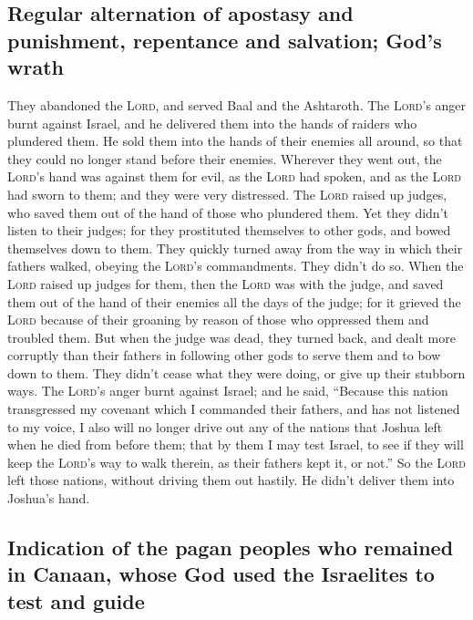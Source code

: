 \hypertarget{regular-alternation-of-apostasy-and-punishment-repentance-and-salvation-gods-wrath}{%
\subsection{Regular alternation of apostasy and punishment, repentance
and salvation; God's
wrath}\label{regular-alternation-of-apostasy-and-punishment-repentance-and-salvation-gods-wrath}}

 They abandoned the \textsc{Lord}, and served Baal and
the Ashtaroth.  The \textsc{Lord}'s anger burnt against
Israel, and he delivered them into the hands of raiders who plundered
them. He sold them into the hands of their enemies all around, so that
they could no longer stand before their enemies. 
Wherever they went out, the \textsc{Lord}'s hand was against them for
evil, as the \textsc{Lord} had spoken, and as the \textsc{Lord} had
sworn to them; and they were very distressed.  The
\textsc{Lord} raised up judges, who saved them out of the hand of those
who plundered them.  Yet they didn't listen to their
judges; for they prostituted themselves to other gods, and bowed
themselves down to them. They quickly turned away from the way in which
their fathers walked, obeying the \textsc{Lord}'s commandments. They
didn't do so.  When the \textsc{Lord} raised up judges
for them, then the \textsc{Lord} was with the judge, and saved them out
of the hand of their enemies all the days of the judge; for it grieved
the \textsc{Lord} because of their groaning by reason of those who
oppressed them and troubled them.  But when the judge was
dead, they turned back, and dealt more corruptly than their fathers in
following other gods to serve them and to bow down to them. They didn't
cease what they were doing, or give up their stubborn ways.
 The \textsc{Lord}'s anger burnt against Israel; and he
said, ``Because this nation transgressed my covenant which I commanded
their fathers, and has not listened to my voice,  I also
will no longer drive out any of the nations that Joshua left when he
died from before them;  that by them I may test Israel,
to see if they will keep the \textsc{Lord}'s way to walk therein, as
their fathers kept it, or not.''  So the \textsc{Lord}
left those nations, without driving them out hastily. He didn't deliver
them into Joshua's hand.

\hypertarget{indication-of-the-pagan-peoples-who-remained-in-canaan-whose-god-used-the-israelites-to-test-and-guide}{%
\subsection{Indication of the pagan peoples who remained in Canaan,
whose God used the Israelites to test and
guide}\label{indication-of-the-pagan-peoples-who-remained-in-canaan-whose-god-used-the-israelites-to-test-and-guide}}

